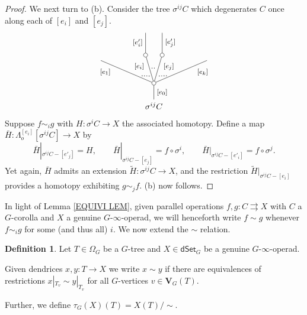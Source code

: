 \documentclass[a4paper,10pt
,draft
]{article}%
\numberwithin{equation}{section}
\numberwithin{figure}{section}
\theoremstyle{definition} %
\newtheorem{definition}[equation]{Definition}%
\newcommand{\1}{\ensuremath{\mathbbm 1}}%
\begin{document}
\begin{proof}
We next turn to (b). Consider the tree $\sigma^{ij} C$ which degenerates $C$ once along each of $[e_i]$ and $[e_j]$.
\[
\begin{tikzpicture}
[grow=up,auto,level distance=2.75em,
every node/.style = {font=\footnotesize},
dummy/.style={circle,draw,inner sep=0pt,minimum size=1.75mm}]
	\node at (0,0) [font=\normalsize]{$\sigma^{ij} C$}
		child{node [dummy] {}
			child{
			edge from parent node [swap,near end] {$[e_k]$} node [near start,inner sep=1pt,name=Kn] {}}
			child[level distance=3.4em,sibling distance=2em]{node [dummy] {}
				child[level distance=2.7em]{
				edge from parent node [swap] {$[e'_j]$}
}
			edge from parent node [very near end,swap] {$[e_j]$}
node [near start,inner sep=1pt,name=Kone,swap] {}
node [inner sep=1pt,name=Kn2] {}}
			child[level distance=3.4em,sibling distance=2em]{node [dummy] {}
				child[level distance=2.7em]{
				edge from parent node {$[e'_i]$}
}
			edge from parent node [very near end] {$[e_i]$}
node [inner sep=1pt,name=Kone2,swap] {}
node [near start,inner sep=1pt,name=Kone1] {}}
			child{
			edge from parent node [near end] {$[e_1]$}
node [swap] {}
node [near start,inner sep=1pt,name=Kn1,swap]{}}
		edge from parent node [swap] {$[e_0]$}
		};
		\draw [dotted,thick] (Kn) -- (Kone) ;
		\draw [dotted,thick] (Kone1) -- (Kn1) ;
		\draw [dotted,thick] (Kone2) -- (Kn2) ;
\end{tikzpicture}
\]
Suppose $f \sim_i g$ with $H \colon \sigma^{i} C \to X$ the associated homotopy.
Define a map 
$\bar{H} \colon \Lambda^{[e_i]}_o[\sigma^{ij} C] \to X$ by
\[
	\bar{H}|_{\sigma^{ij}C - [e'_j]} = H,
		\qquad
	\bar{H}|_{\sigma^{ij}C - [e_j]} = f \circ \sigma^i,
		\qquad
	\bar{H}|_{\sigma^{ij}C - [e'_i]} = f \circ \sigma^j.
\]
Yet again, $\bar{H}$ admits an extension $\widetilde{H} \colon \sigma^{ij}C \to X$, and the restriction $\widetilde{H}|_{\sigma^{ij}C - [e_i]}$
provides a homotopy exhibiting $g \sim_j f$. (b) now follows.
\end{proof}



In light of Lemma \ref{EQUIVI LEM},
given parallel operations $f,g \colon C \rightrightarrows X$ with 
$C$ a $G$-corolla and $X$ a genuine $G$-$\infty$-operad,
we will henceforth write $f \sim g$ whenever $f \sim_i g$ for some (and thus all) $i$.
We now extend the $\sim$ relation.

\begin{definition}\label{XTENDSIM DEF}
	Let $T \in \Omega_G$ be a $G$-tree
	and $X \in \mathsf{dSet}_G$ be a 
	genuine $G$-$\infty$-operad.
	
	Given dendrices $x,y\colon T \to X$ we write
	$x \sim y$ if there are equivalences of restrictions
	$x|_{T_v} \sim y|_{T_v}$ for all $G$-vertices
	$v \in \boldsymbol{V}_G(T)$.
	
	Further, we define $\tau_G(X)(T) = X(T)/\sim$.
\end{definition}
\end{document}
